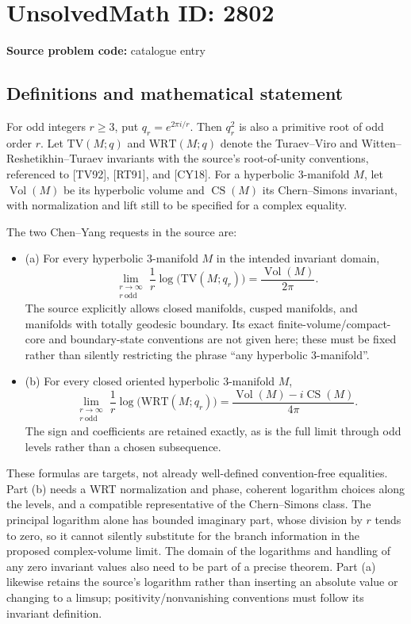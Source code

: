 \documentclass[11pt]{article}
\begin{document}
\section*{UnsolvedMath ID: 2802}
\textbf{Source problem code:} catalogue entry
\subsection{Definitions and mathematical statement}
For odd integers $r\geq3$, put $q_r=e^{2\pi i/r}$. Then $q_r^2$ is also a primitive root of odd order $r$. Let $\mathrm{TV}(M;q)$ and $\mathrm{WRT}(M;q)$ denote the Turaev--Viro and Witten--Reshetikhin--Turaev invariants with the source's root-of-unity conventions, referenced to [TV92], [RT91], and [CY18]. For a hyperbolic $3$-manifold $M$, let $\operatorname{Vol}(M)$ be its hyperbolic volume and $\operatorname{CS}(M)$ its Chern--Simons invariant, with normalization and lift still to be specified for a complex equality.

The two Chen--Yang requests in the source are:
\begin{itemize}
\item (a) For every hyperbolic $3$-manifold $M$ in the intended invariant domain,
\[\lim_{\substack{r\to\infty\\r\ \mathrm{odd}}}\frac1r\log\bigl(\mathrm{TV}(M;q_r)\bigr)=\frac{\operatorname{Vol}(M)}{2\pi}.\]
The source explicitly allows closed manifolds, cusped manifolds, and manifolds with totally geodesic boundary. Its exact finite-volume/compact-core and boundary-state conventions are not given here; these must be fixed rather than silently restricting the phrase ``any hyperbolic $3$-manifold''.
\item (b) For every closed oriented hyperbolic $3$-manifold $M$,
\[\lim_{\substack{r\to\infty\\r\ \mathrm{odd}}}\frac1r\log\bigl(\mathrm{WRT}(M;q_r)\bigr)=\frac{\operatorname{Vol}(M)-i\operatorname{CS}(M)}{4\pi}.\]
The sign and coefficients are retained exactly, as is the full limit through odd levels rather than a chosen subsequence.
\end{itemize}
These formulas are targets, not already well-defined convention-free equalities. Part (b) needs a WRT normalization and phase, coherent logarithm choices along the levels, and a compatible representative of the Chern--Simons class. The principal logarithm alone has bounded imaginary part, whose division by $r$ tends to zero, so it cannot silently substitute for the branch information in the proposed complex-volume limit. The domain of the logarithms and handling of any zero invariant values also need to be part of a precise theorem. Part (a) likewise retains the source's logarithm rather than inserting an absolute value or changing to a limsup; positivity/nonvanishing conventions must follow its invariant definition.
\end{document}
